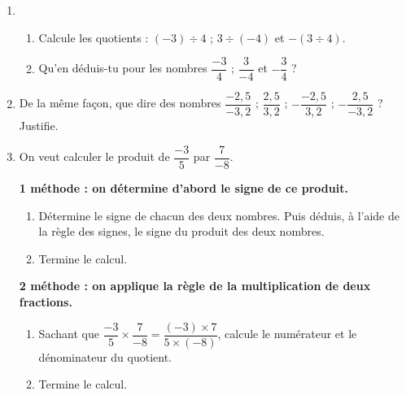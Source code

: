\begin{activite}
\begin{enumerate}
\item \begin{enumerate}
    \item Calcule les quotients : $(-3) \div 4$ ; $3 \div (-4)$ et $-(3 \div 4)$.
    \item Qu'en déduis-tu pour les nombres $\dfrac{-3}{4}$ ; $\dfrac{3}{-4}$ et $-\dfrac{3}{4}$ ?
\end{enumerate}
\item De la même façon, que dire des nombres $\dfrac{-2,5}{-3,2}$ ; $\dfrac{2,5}{3,2}$ ; $-\dfrac{-2,5}{3,2}$ ; $-\dfrac{2,5}{-3,2}$ ? Justifie.
\item On veut calculer le produit de $\dfrac{-3}{5}$ par $\dfrac{7}{-8}$.

\vspace{1em}
\textbf{1 méthode : on détermine d'abord le signe de ce produit.}

    \begin{enumerate}
        \item  Détermine le signe de chacun des deux nombres. Puis déduis, à l'aide de la règle des signes, le signe du produit des deux nombres.
        \item Termine le calcul.
    \end{enumerate}
    
\vspace{1em}
\textbf{2 méthode : on applique la règle de la multiplication de deux fractions.}
    \begin{enumerate}
        \item Sachant que $\dfrac{-3}{5} \times \dfrac{7}{-8} = \dfrac{(-3)\times 7}{5 \times (-8)}$, calcule le numérateur et le dénominateur du quotient.
        \item Termine le calcul.
    \end{enumerate}
\end{enumerate}
\end{activite}



